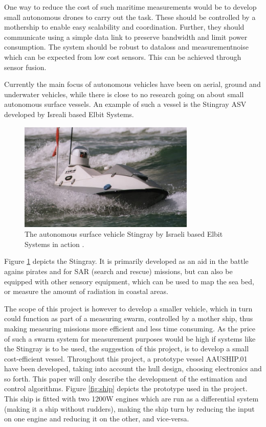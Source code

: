 \documentclass{ifacconf}
\begin{document}
One way to reduce the cost of such maritime measurements would be to develop small autonomous drones to carry out the task. These should be controlled by a mothership to enable easy scalability and coordination. Further, they should communicate using a simple data link to preserve bandwidth and limit power consumption. The system should be robust to dataloss and measurementnoise which can be expected from low cost sensors. This can be achieved through sensor fusion.

Currently the main focus of autonomous vehicles have been on aerial, ground and underwater vehicles, while there is close to no research going on about small autonomous surface vessels. An example of such a vessel is the Stingray ASV developed by Isreali based Elbit Systems. 
\begin{figure}
	\begin{center}
		\includegraphics[width=8.4cm]{img/stingray.jpg} %
		\caption{The autonomous surface vehicle Stingray by Israeli based Elbit Systems in action \cite{defense}.}  
		\label{fig:stingray}
	\end{center}
\end{figure}

Figure \ref{fig:stingray} depicts the Stingray. It is primarily developed as an aid in the battle agains pirates and for SAR (search and rescue) missions, but can also be equipped with other sensory equipment, which can be used to map the sea bed, or measure the amount of radiation in coastal areas. 

The scope of this project is however to develop a smaller vehicle, which in turn could function as part of a measuring swarm, controlled by a mother ship, thus making measuring missions more efficient and less time consuming. As the price of such a swarm system for measurement purposes would be high if systems like the Stingray is to be used, the suggestion of this project, is to develop a small cost-efficient vessel. Throughout this project, a prototype vessel AAUSHIP.01 have been developed, taking into account the hull design, choosing electronics and so forth. This paper will only describe the development of the estimation and control algorithms. Figure \ref{fig:ship} depicts the prototype used in the project. This ship is fitted with two 1200W engines which are run as a differential system (making it a ship without rudders), making the ship turn by reducing the input on one engine and reducing it on the other, and vice-versa. 
\end{document}
